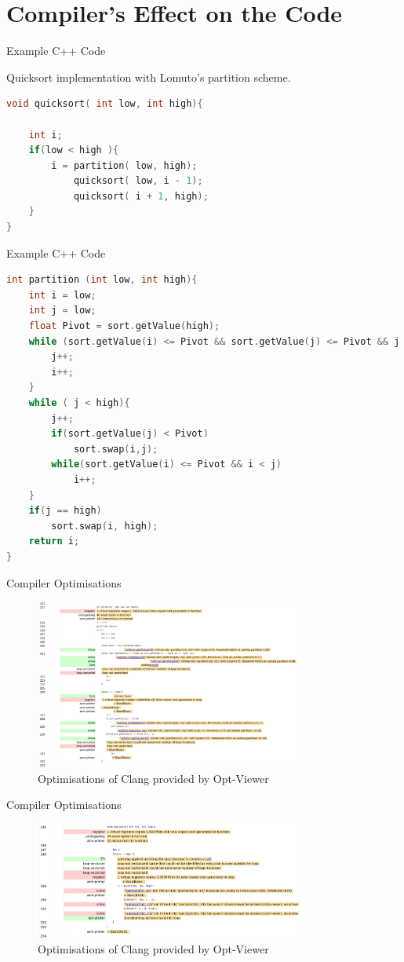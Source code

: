 
\section{Compiler's Effect on the Code}

\begin{frame}[fragile]{Example C++ Code}
\begin{block}{}
    Quicksort implementation with Lomuto's partition scheme.
\end{block}
\begin{lstlisting}[language=C++]
void quicksort( int low, int high){

    int i;
    if(low < high ){
        i = partition( low, high);
            quicksort( low, i - 1);
            quicksort( i + 1, high);
    }
}
\end{lstlisting}   
\end{frame}
\begin{frame}[fragile]{Example C++ Code}
\begin{lstlisting}[language=C++]
    int partition (int low, int high){
    int i = low;
    int j = low;
    float Pivot = sort.getValue(high); 
    while (sort.getValue(i) <= Pivot && sort.getValue(j) <= Pivot && j < high -1){
        j++;
        i++;
    }
    while ( j < high){
        j++;
        if(sort.getValue(j) < Pivot)
            sort.swap(i,j);
        while(sort.getValue(i) <= Pivot && i < j)
            i++;
    }
    if(j == high)
        sort.swap(i, high);
    return i;
}
\end{lstlisting}
\end{frame}


\begin{frame}{Compiler Optimisations}
    
\begin{figure}
\includegraphics[width=0.8\textwidth]{partition_optviewer.png}
\caption{Optimisations of Clang provided by Opt-Viewer}
\label{part_opt}
\end{figure}
\end{frame}

\begin{frame}{Compiler Optimisations}
    
\begin{figure}
\includegraphics[width=0.8\textwidth]{quicksort_optviewer.png}
\caption{Optimisations of Clang provided by Opt-Viewer}
\label{qs_opt}
\end{figure}
\end{frame}
